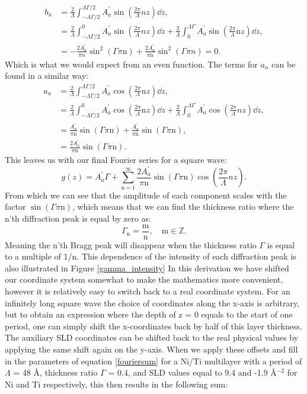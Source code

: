 \begin{align}
	b_n &=  \frac{2}{\Lambda}\int_{-\Lambda\Gamma/2}^{\Lambda\Gamma/2} A_a^\prime\sin(\frac{2\pi}{\Lambda}nz) \dd z, \\
	&= \frac{2}{\Lambda}\int_{-\Lambda\Gamma/2}^{0} A_a^\prime\sin(\frac{2\pi}{\Lambda}nz) \dd z + \frac{2}{\Lambda}\int_{0}^{\Lambda\Gamma}  A_a^\prime\sin(\frac{2\pi}{\Lambda}\textrm{n}z) \dd z,  \\
	&= - \frac{2A_a^\prime}{\pi n} \sin^2(\Gamma \pi \textrm{n}) +  \frac{2A_a^\prime}{\pi \textrm{n}} \sin^2(\Gamma \pi n) = 0.
\end{align}
Which is what we would expect from an even function. The terms for $a_n$ can be found in a similar way:
\begin{align}
	a_n &=  \frac{2}{\Lambda}\int_{-\Lambda\Gamma/2}^{\Lambda\Gamma/2} A_a^\prime\cos(\frac{2\pi}{\Lambda}\textrm{n}z) \dd z, \\
	&= \frac{2}{\Lambda}\int_{-\Lambda\Gamma/2}^{0} A_a^\prime\cos(\frac{2\pi}{\Lambda}\textrm{n}z) \dd z + \frac{2}{\Lambda}\int_{0}^{\Lambda\Gamma}  A_a^\prime\cos(\frac{2\pi}{\Lambda}nz) \dd z,  \\
	&= \frac{A_a^\prime}{\pi \textrm{n}} \sin(\Gamma \pi \textrm{n}) +  \frac{A_a^\prime}{\pi \textrm{n}} \sin(\Gamma \pi \textrm{n}), \\
	&=  \frac{2A_a^\prime}{\pi \textrm{n}} \sin(\Gamma \pi \textrm{n}).
\end{align}
This leaves us with our final Fourier series for a square wave:
\begin{equation}\label{fouriersum}
	g(z) = A_a^\prime\Gamma + \sum_{\textrm{n}=1}^{ \infty }  	\frac{2A_a^\prime}{\pi \textrm{n}} \sin(\Gamma \pi \textrm{n}) \cos(\frac{2\pi}{\Lambda}nz).
\end{equation}
From which we can see that the amplitude of each component scales with the factor $\sin(\Gamma \pi \textrm{n})$, which means that we can find the thickness ratio where the n'th diffraction peak is equal by zero as:
\begin{equation}
	\Gamma_\textrm{n} = \frac{\textrm{m}}{\textrm{n}}, \quad \textrm{m} \in \mathbb{Z}.
\end{equation}
Meaning the n'th Bragg peak will disappear when the thickness ratio $\Gamma$ is equal to a multiple of 1/n. This dependence of the intensity of each diffraction peak is also illustrated in Figure \ref{gamma_intensity} In this derivation we have shifted our coordinate system somewhat to make the mathematics more convenient, however it is relatively easy to switch back to a real coordinate system. For an infinitely long square wave the choice of coordinates along the x-axis is arbitrary, but to obtain an expression where the depth of z = 0 equals to the start of one period, one can simply shift the x-coordinates back by half of this layer thickness. The auxiliary SLD coordinates can be shifted back to the real physical values by applying the same shift again on the y-axis. When we apply these offsets and fill in the parameters of equation \ref{fouriersum} for a Ni/Ti multilayer with a period of $\Lambda$ = 48 Å, thickness ratio $\Gamma$ = 0.4, and SLD values equal to 9.4 and -1.9 Å$^{-2}$ for Ni and Ti respectively, this then results in the following sum:
